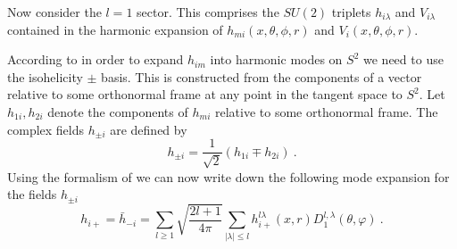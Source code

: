 \documentclass[a4paper,12pt]{article}
\begin{document}
Now consider the $l=1$ sector. This comprises the $SU(2)$ triplets
$h_{i\lambda}$ and $V_{i\lambda}$ contained in the harmonic
expansion of $h_{mi}(x, \theta,\phi, r)$ and $V_i(x, \theta,\phi,
r)$.

According to \cite{Randjbar-Daemi:1982hi} in order to expand
$h_{im}$ into harmonic modes on $S^2$ we need to use  the isohelicity
$\pm$ basis. This is constructed from the components of a vector
relative to some orthonormal frame at any point in the tangent space
to $S^2$. Let $h_{1i},h_{2i}$ denote the components of $h_{mi}$
relative to some orthonormal frame. The complex fields $h_{\pm
i}$ are defined by
\begin{equation}
 h_{\pm i}= \frac{1}{\sqrt{2}}(h_{1i} \mp h_{2i})~.
\end{equation}
Using the formalism of
\cite{Randjbar-Daemi:1982hi,Randjbar-Daemi:1983bw}
we can now write down the following mode
expansion for the fields $h_{\pm i}$
\begin{equation}
  h_{i+} = \bar h_{-i} =\sum_{l\geq
1}\sqrt{\frac{2l+1}{4\pi}}\sum_{\mid
  \lambda\mid\leq l} h_{i+} ^{l\lambda} (x, r)
  D_1 ^{l,\lambda}(\theta,\varphi)~.
\end{equation}
\end{document}

